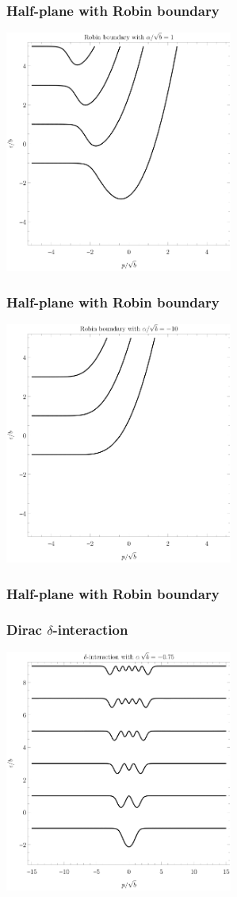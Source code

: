 \documentclass{beamer}
\begin{document}
\begin{frame}
    \frametitle{Half-plane with Robin boundary}
    \centering
    \includegraphics[height=225pt]{plots/robin7.pdf}
\end{frame}

\begin{frame}
    \frametitle{Half-plane with Robin boundary}
    \centering
    \includegraphics[height=225pt]{plots/robin1.pdf}
\end{frame}

\begin{frame}
    \frametitle{Half-plane with Robin boundary}
    \centering
\end{frame}

\begin{frame}
    \frametitle{Dirac $\delta$-interaction}
    \centering
    \includegraphics[height=225pt]{plots/dirac4.pdf}
\end{frame}
\end{document}
